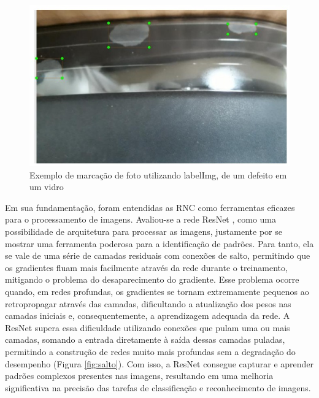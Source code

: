 \begin{figure}[!h]
    \center
    \begin{minipage}{0.9\linewidth}
        \center
        \captionsetup{justification=centering,margin=0.5cm,font=small}
        \includegraphics[width=0.7\linewidth]{img/cap3/mancha-marcacao.jpeg}
        \caption{Exemplo de marcação de foto utilizando labelImg, de um defeito em um vidro \cite{gonzaga2023identificaccao}}
        \label{fig:mancha}
    \end{minipage}
\end{figure}

Em sua fundamentação, foram entendidas as RNC como ferramentas eficazes para o processamento de imagens. Avaliou-se a rede ResNet \cite{he2016deep}, como uma possibilidade de arquitetura para processar as imagens, justamente por se mostrar uma ferramenta poderosa para a identificação de padrões. Para tanto, ela se vale de uma série de camadas residuais com conexões de salto, permitindo que os gradientes fluam mais facilmente através da rede durante o treinamento, mitigando o problema do desaparecimento do gradiente. Esse problema ocorre quando, em redes profundas, os gradientes se tornam extremamente pequenos ao retropropagar através das camadas, dificultando a atualização dos pesos nas camadas iniciais e, consequentemente, a aprendizagem adequada da rede. A ResNet supera essa dificuldade utilizando conexões que pulam uma ou mais camadas, somando a entrada diretamente à saída dessas camadas puladas, permitindo a construção de redes muito mais profundas sem a degradação do desempenho (Figura \ref{fig:salto}). Com isso, a ResNet consegue capturar e aprender padrões complexos presentes nas imagens, resultando em uma melhoria significativa na precisão das tarefas de classificação e reconhecimento de imagens.
	

